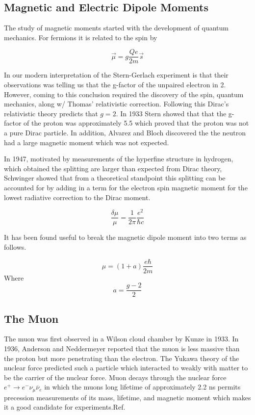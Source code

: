 \documentclass[./Thesis]{subfiles}
\begin{document}
\subsection{Magnetic and Electric Dipole Moments}

	The study of magnetic moments started with the development of quantum mechanics. For fermions it is related to the spin by 
	
	\begin{equation}\label{EQ:MDM}
	\vec{\mu} = g \frac{Qe}{2m} \vec{s}
	\end{equation}
	
In our modern interpretation of the Stern-Gerlach experiment is that their observations was telling us that the g-factor of the unpaired electron in 2.  However, coming to this conclusion required the discovery of the spin, quantum mechanics, along w/ Thomas' relativistic correction. Following this Dirac's relativistic theory predicts that $g=2$. In 1933 Stern showed that that the g-factor of the proton was approximately 5.5 which proved that the proton was not a pure Dirac particle. In addition, Alvarez and Bloch discovered the the neutron had a large magnetic moment which was not expected.

In 1947, motivated by measurements of the hyperfine structure in hydrogen, which obtained the splitting are larger than expected from Dirac theory, Schwinger showed that from a theoretical standpoint this splitting can be accounted for by adding in a term for the electron spin magnetic moment for the lowest radiative correction to the Dirac moment.

	\begin{equation}
	\frac{\delta\mu}{\mu}  = \frac{1}{2 \pi } \frac{e^2}{\hbar c}
	\end{equation}
	
It has been found useful to break the magnetic dipole moment into two terms as follows.\cite{TDR}
	
	\begin{equation}
	\mu = (1+a)\frac{e\hbar}{2m}
	\end{equation}
	Where
	\begin{equation}
	a = \frac{g-2}{2}
	\end{equation}
	
	
\subsection{The Muon}

	The muon was first observed in a Wilson cloud chamber by Kunze in 1933. In 1936, Anderson and Neddermeyer reported that the muon is less massive than the proton but more penetrating than the electron. The Yukawa theory of the nuclear force predicted such a particle which interacted to weakly with matter to be the carrier of the nuclear force. Muon decays through the nuclear force $e^+ \rightarrow e^{-}\nu_{\mu}\overline{\nu}_{e}$ in which the muons long lifetime of approximately 2.2 ns permits precession measurements of its mass, lifetime, and magnetic moment which makes it a good candidate for experiments.Ref. \cite{TDR}
\end{document}
